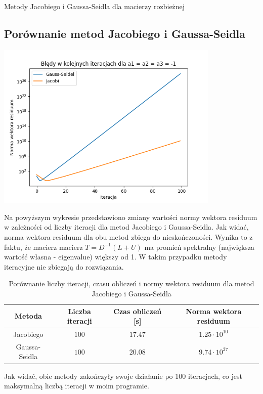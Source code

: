 \documentclass{article}
\begin{document}
\begin{section}{Metody Jacobiego i Gaussa-Seidla dla macierzy rozbieżnej}
    \subsection{Porównanie metod Jacobiego i Gaussa-Seidla}
    \begin{center}
        \includegraphics[width=0.8\textwidth]{bledy_rozbiezne.png}
    \end{center}
    Na powyższym wykresie przedstawiono zmiany wartości normy wektora residuum w zależności od liczby iteracji
    dla metod Jacobiego i Gaussa-Seidla. Jak widać, norma wektora residuum dla obu metod zbiega do nieskończoności.
    Wynika to z faktu, że macierz macierz $T = D^{-1}(L + U)$ ma promień spektralny (największa wartość własna - eigenvalue)
    większy od 1\cite{wyklad3}. W takim przypadku metody iteracyjne nie zbiegają do rozwiązania.

    \begin{table}[H]
        \centering
        \begin{tabular}{|c|c|c|c|}
            \hline
            Metoda & Liczba iteracji & Czas obliczeń [s] & Norma wektora residuum \\
            \hline
            Jacobiego & $100$ & $17.47$ & $1.25\cdot10^{10}$ \\
            Gaussa-Seidla & $100$ & $20.08$ & $9.74\cdot10^{27}$ \\
            \hline
        \end{tabular}
        \caption{Porównanie liczby iteracji, czasu obliczeń i normy wektora residuum dla metod Jacobiego i Gaussa-Seidla}
    \end{table}
    Jak widać, obie metody zakończyły swoje działanie po 100 iteracjach, co jest maksymalną liczbą iteracji w moim programie.

\end{section}
\end{document}
